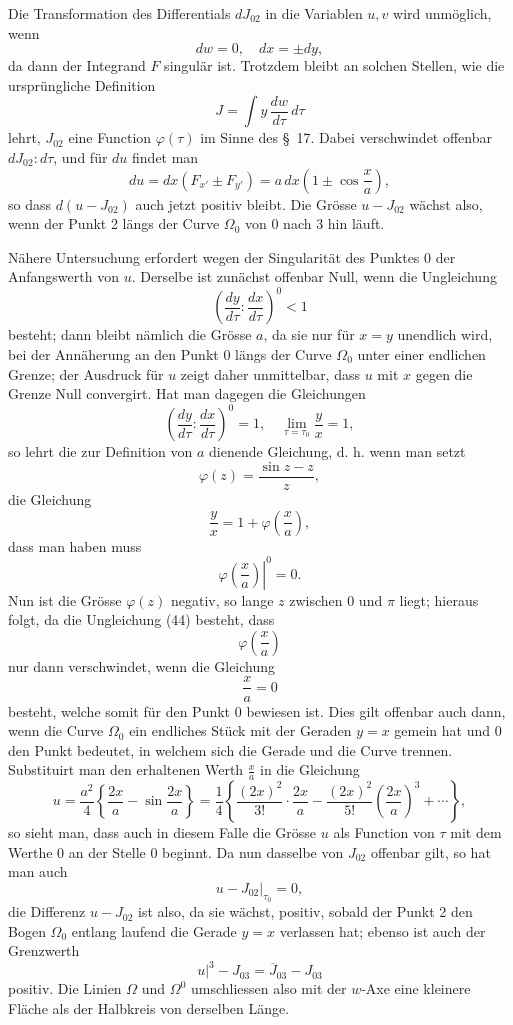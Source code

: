 \documentclass[11pt,a4paper,leqno]{article}
\begin{document}
Die Transformation des Differentials $dJ_{02}$ in die Variablen $u,v$ wird unmöglich, wenn
\[
dw=0,\quad dx=\pm dy,
\]
da dann der Integrand $F$ singulär ist. Trotzdem bleibt an solchen Stellen, wie die ursprüngliche Definition
\[
J=\int y\,\frac{dw}{d\tau}\,d\tau
\]
lehrt, $J_{02}$ eine Function $\varphi(\tau)$ im Sinne des \S~17. Dabei verschwindet offenbar $dJ_{02}:d\tau$, und für $du$ findet man
\[
du=dx(F_{x'}\pm F_{y'})=a\,dx\left(1\pm\cos\frac{x}{a}\right),
\]
so dass $d(u-J_{02})$ auch jetzt positiv bleibt. Die Grösse $u-J_{02}$ wächst also, wenn der Punkt 2 längs der Curve $\Omega_0$ von 0 nach 3 hin läuft.

Nähere Untersuchung erfordert wegen der Singularität des Punktes 0 der Anfangswerth von $u$. Derselbe ist zunächst offenbar Null, wenn die Ungleichung
\[
\left(\frac{dy}{d\tau}:\frac{dx}{d\tau}\right)^0<1
\]
besteht; dann bleibt nämlich die Grösse $a$, da sie nur für $x=y$ unendlich wird, bei der Annäherung an den Punkt 0 längs der Curve $\Omega_0$ unter einer endlichen Grenze; der Ausdruck für $u$ zeigt daher unmittelbar, dass $u$ mit $x$ gegen die Grenze Null convergirt. Hat man dagegen die Gleichungen
\[
\left(\frac{dy}{d\tau}:\frac{dx}{d\tau}\right)^0=1,\quad
\lim_{\tau=\tau_0}\frac{y}{x}=1,
\]
so lehrt die zur Definition von $a$ dienende Gleichung, d. h. wenn man setzt
\[
\varphi(z)=\frac{\sin z-z}{z},
\]
die Gleichung
\[
\frac{y}{x}=1+\varphi\left(\frac{x}{a}\right),
\]
dass man haben muss
\[
\left.\varphi\left(\frac{x}{a}\right)\right|^0=0.
\]
Nun ist die Grösse $\varphi(z)$ negativ, so lange $z$ zwischen 0 und $\pi$ liegt; hieraus folgt, da die Ungleichung (44) besteht, dass
\[
\varphi\left(\frac{x}{a}\right)
\]
nur dann verschwindet, wenn die Gleichung
\[
\frac{x}{a}=0
\]
besteht, welche somit für den Punkt 0 bewiesen ist. Dies gilt offenbar auch dann, wenn die Curve $\Omega_0$ ein endliches Stück mit der Geraden $y=x$ gemein hat und 0 den Punkt bedeutet, in welchem sich die Gerade und die Curve trennen. Substituirt man den erhaltenen Werth $\frac{x}{a}$ in die Gleichung
\[
u=\frac{a^2}{4}\left\{\frac{2x}{a}-\sin\frac{2x}{a}\right\}
=
\frac{1}{4}\left\{
\frac{(2x)^2}{3!}\cdot\frac{2x}{a}
-
\frac{(2x)^2}{5!}\left(\frac{2x}{a}\right)^3
+\cdots
\right\},
\]
so sieht man, dass auch in diesem Falle die Grösse $u$ als Function von $\tau$ mit dem Werthe 0 an der Stelle 0 beginnt. Da nun dasselbe von $J_{02}$ offenbar gilt, so hat man auch
\[
\left.u-J_{02}\right|_{\tau_0}=0,
\]
die Differenz $u-J_{02}$ ist also, da sie wächst, positiv, sobald der Punkt 2 den Bogen $\Omega_0$ entlang laufend die Gerade $y=x$ verlassen hat; ebenso ist auch der Grenzwerth
\[
\left.u\right|^3-J_{03}=\overline{J}_{03}-J_{03}
\]
positiv. Die Linien $\Omega$ und $\Omega^0$ umschliessen also mit der $w$-Axe eine kleinere Fläche als der Halbkreis von derselben Länge.
\end{document}
